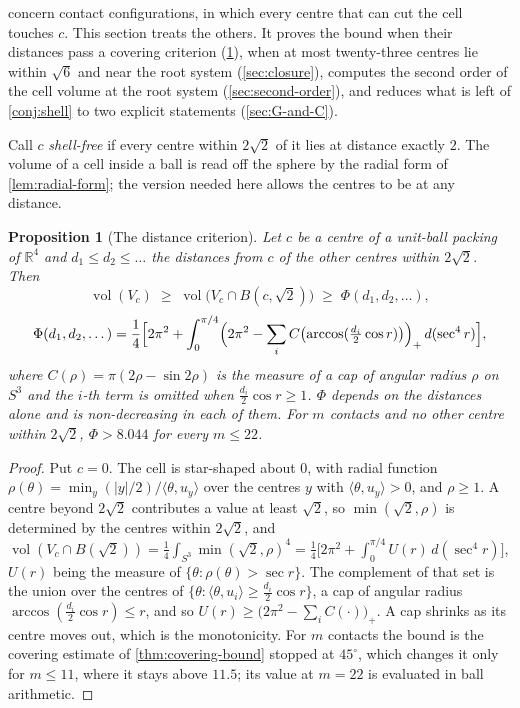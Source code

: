\documentclass[11pt,reqno]{amsart}
\renewcommand{\_}{\origunderscore\allowbreak}
\numberwithin{equation}{section}
\theoremstyle{plain}
\newtheorem{prop}[thm]{Proposition}
\theoremstyle{definition}
\theoremstyle{remark}
\DeclareMathOperator{\vol}{vol}
\begin{document}
 concern contact configurations,
in which every centre that can cut the cell touches $c$. This section treats the others. It
proves the bound when their distances pass a covering criterion
(\cref{prop:distance-criterion}), when at most twenty-three centres lie
within $\sqrt6$ and near the root system (\cref{sec:closure}), computes the
second order of the cell volume at the root system
(\cref{sec:second-order}), and reduces what is left of \cref{conj:shell} to
two explicit statements (\cref{sec:G-and-C}).

Call $c$ \emph{shell-free} if every centre within $2\sqrt2$ of it lies at
distance exactly $2$. The volume of a cell inside a ball is read off
the sphere by the radial form of \cref{lem:radial-form}; the version
needed here allows the centres to be at any distance.

\begin{prop}[The distance criterion]\label{prop:distance-criterion}
Let $c$ be a centre of a unit-ball packing of $\mathbb{R}^4$ and
$d_1\le d_2\le\dots$ the distances from $c$ of the other centres within
$2\sqrt2$. Then
\[
  \vol(V_c)\;\ge\;\vol\bigl(V_c\cap B(c,\sqrt2)\bigr)\;\ge\;
  \Phi(d_1,d_2,\dots),
\]
\[
  \Phi(d_1,d_2,\dots)=\frac14\Bigl[2\pi^2+\int_0^{\pi/4}
  \Bigl(2\pi^2-\sum_iC\bigl(\arccos(\tfrac{d_i}2\cos r)\bigr)\Bigr)_+\,
  d(\sec^4r)\Bigr],
\]
where $C(\rho)=\pi(2\rho-\sin2\rho)$ is the measure of a cap of angular
radius $\rho$ on $S^3$ and the $i$-th term is omitted when
$\tfrac{d_i}2\cos r\ge1$. $\Phi$ depends on the distances alone and is
non-decreasing in each of them. For $m$ contacts and no other centre
within $2\sqrt2$, $\Phi>8.044$ for every $m\le22$.
\end{prop}

\begin{proof}
Put $c=0$. The cell is star-shaped about $0$, with radial function
$\rho(\theta)=\min_y(|y|/2)/\langle\theta,u_y\rangle$ over the centres $y$
with $\langle\theta,u_y\rangle>0$, and $\rho\ge1$. A centre beyond
$2\sqrt2$ contributes a value at least $\sqrt2$, so
$\min(\sqrt2,\rho)$ is determined by the centres within $2\sqrt2$, and
$\vol(V_c\cap B(\sqrt2))=\tfrac14\int_{S^3}\min(\sqrt2,\rho)^4
=\tfrac14\bigl[2\pi^2+\int_0^{\pi/4}U(r)\,d(\sec^4r)\bigr]$, $U(r)$ being
the measure of $\{\theta:\rho(\theta)>\sec r\}$. The complement of that
set is the union over the centres of
$\{\theta:\langle\theta,u_i\rangle\ge\tfrac{d_i}2\cos r\}$, a cap of
angular radius $\arccos(\tfrac{d_i}2\cos r)\le r$, and so
$U(r)\ge\bigl(2\pi^2-\sum_iC(\cdot)\bigr)_+$. A cap shrinks as its centre
moves out, which is the monotonicity. For $m$ contacts the bound is the
covering estimate of \cref{thm:covering-bound} stopped at $45^\circ$,
which changes it only for $m\le11$, where it stays above $11.5$; its value at
$m=22$ is evaluated in ball arithmetic.
\end{proof}
\end{document}

